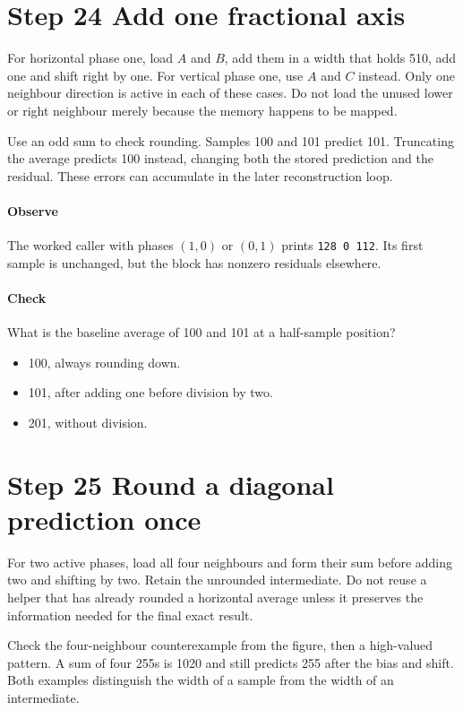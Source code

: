 \section{Step 24 Add one fractional axis}\label{h263-prediction-s04}
For horizontal phase one, load $A$ and $B$, add them in a width that holds 510,
add one and shift right by one. For vertical phase one, use $A$ and $C$ instead.
Only one neighbour direction is active in each of these cases. Do not load the
unused lower or right neighbour merely because the memory happens to be mapped.

Use an odd sum to check rounding. Samples 100 and 101 predict 101. Truncating
the average predicts 100 instead, changing both the stored prediction and the
residual. These errors can accumulate in the later reconstruction loop.

\paragraph{Observe} The worked caller with phases $(1,0)$ or $(0,1)$ prints
\texttt{128 0 112}. Its first sample is unchanged, but the block has nonzero
residuals elsewhere.
\paragraph{Check} What is the baseline average of 100 and 101 at a half-sample position?
\begin{itemize}
  \item[A.] 100, always rounding down.
  \item[B.] 101, after adding one before division by two.
  \item[C.] 201, without division.
\end{itemize}

\section{Step 25 Round a diagonal prediction once}\label{h263-prediction-s05}
For two active phases, load all four neighbours and form their sum before adding
two and shifting by two. Retain the unrounded intermediate. Do not reuse a helper
that has already rounded a horizontal average unless it preserves the information
needed for the final exact result.

Check the four-neighbour counterexample from the figure, then a high-valued
pattern. A sum of four 255s is 1020 and still predicts 255 after the bias and shift.
Both examples distinguish the width of a sample from the width of an intermediate.

